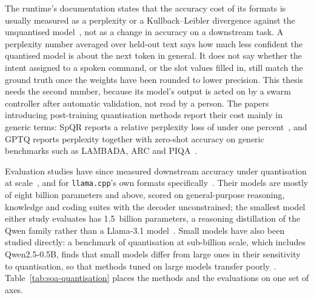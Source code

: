 The runtime's documentation states that the accuracy cost of its formats is usually measured as
a perplexity or a Kullback--Leibler divergence against the unquantised model~\cite{llamacpp},
not as a change in accuracy on a downstream task. A perplexity number averaged over held-out text
says how much less confident the quantised model is about the next token in general. It does not
say whether the intent assigned to a spoken command, or the slot values filled in, still match the
ground truth once the weights have been rounded to lower precision. This thesis needs the
second number, because its model's output is acted on by a swarm controller after automatic
validation, not read by a person. The papers introducing post-training quantisation methods report
their cost mainly in generic terms: SpQR reports a relative perplexity loss of under one
percent~\cite{spqr}, and GPTQ reports perplexity together with zero-shot accuracy on generic
benchmarks such as LAMBADA, ARC and PIQA~\cite{gptq}.

Evaluation studies have since measured downstream accuracy under quantisation at
scale~\cite{kurtic2025}, and for \texttt{llama.cpp}'s own formats specifically~\cite{kurt2026}. Their
models are mostly of eight billion parameters and above, scored on general-purpose reasoning,
knowledge and coding suites with the decoder unconstrained; the smallest model either study
evaluates has 1.5~billion parameters, a reasoning distillation of the Qwen family rather than a
Llama-3.1 model~\cite{kurtic2025}. Small models have also been studied
directly: a benchmark of quantisation at sub-billion scale, which includes Qwen2.5-0.5B, finds that
small models differ from large ones in their sensitivity to quantisation, so that methods tuned on
large models transfer poorly~\cite{slmquant}. Table~\ref{tab:soa-quantisation} places the methods
and the evaluations on one set of axes.

